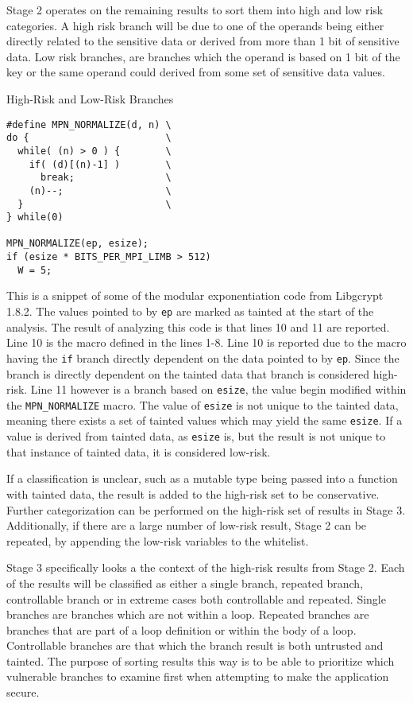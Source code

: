 \documentclass[11pt,a4paper]{article}
\begin{document}
Stage 2 operates on the remaining results to sort them into high and low
risk categories. A high risk branch will be due to one of the operands being
either directly related to the sensitive data or derived from more than 1 bit of
sensitive data. Low risk branches, are branches which the operand is based on 1
bit of the key or the same operand could derived from some set of sensitive data
values.

\begin{algorithm}
  \caption{High-Risk and Low-Risk Branches}
\begin{lstlisting}
#define MPN_NORMALIZE(d, n) \
do {                        \
  while( (n) > 0 ) {        \
    if( (d)[(n)-1] )        \
      break;                \
    (n)--;                  \
  }                         \
} while(0)

MPN_NORMALIZE(ep, esize);
if (esize * BITS_PER_MPI_LIMB > 512)
  W = 5;
\end{lstlisting}
  \label{alg:branch_risk_examples}
\end{algorithm}


This is a snippet of some of the modular exponentiation code from Libgcrypt
1.8.2. The values pointed to by \texttt{ep} are marked as tainted at the start of the
analysis. The result of analyzing this code is that lines 10 and 11 are
reported. Line 10 is the macro defined in the lines 1-8. Line 10 is reported due
to the macro having the \texttt{if} branch directly dependent on the data
pointed to by \texttt{ep}. Since the branch is directly dependent on the tainted
data that branch is considered high-risk. Line 11 however is a branch based on
\texttt{esize}, the value begin modified within the \texttt{MPN\_NORMALIZE}
macro. The value of \texttt{esize} is not unique to the tainted data, meaning there
exists a set of tainted values which may yield the same \texttt{esize}. If a
value is derived from tainted data, as \texttt{esize} is, but the result is not
unique to that instance of tainted data, it is considered low-risk.

If a classification is unclear, such as a mutable type being passed into a
function with tainted data, the result is added to the high-risk set to be
conservative. Further categorization can be performed on the high-risk set of
results in Stage 3. Additionally, if there are a large number of low-risk
result, Stage 2 can be repeated, by appending the low-risk variables to the
whitelist.

Stage 3 specifically looks a the context of the high-risk results from Stage 2.
Each of the results will be classified as either a single branch, repeated
branch, controllable branch or in extreme cases both controllable and repeated.
Single branches are branches which are not within a loop. Repeated branches are
branches that are part of a loop definition or within the body of a loop.
Controllable branches are that which the branch result is both untrusted and
tainted. The purpose of sorting results this way is to be able to prioritize
which vulnerable branches to examine first when attempting to make the
application secure.
\end{document}
